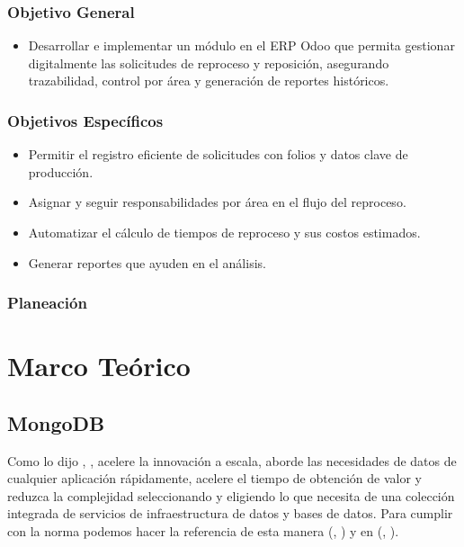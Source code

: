 \documentclass[12pt,letterpaper,spanish]{report}
\begin{document}
\subsection{Objetivo General}
\begin{itemize}
\item Desarrollar e implementar un módulo en el ERP Odoo que permita gestionar digitalmente las solicitudes de reproceso y reposición, asegurando trazabilidad, control por área y generación de reportes históricos.
\end{itemize}
\subsection{Objetivos Específicos}
\begin{itemize}
\item Permitir el registro eficiente de solicitudes con folios y datos clave de producción.
\item Asignar y seguir responsabilidades por área en el flujo del reproceso.
\item Automatizar el cálculo de tiempos de reproceso y sus costos estimados.
\item Generar reportes que ayuden en el análisis.
\end{itemize}
\subsection{Planeación}




\chapter{Marco Teórico}
\newpage

\section{MongoDB}

Como lo dijo \citeauthor{ArBre}, \citeyear{ArBre}, acelere la innovación a escala, aborde las necesidades de datos de cualquier aplicación rápidamente, acelere el tiempo de obtención de valor y reduzca la complejidad seleccionando y eligiendo lo que necesita de una colección integrada de servicios de infraestructura de datos y bases de datos. Para cumplir con la norma podemos hacer la referencia de esta manera (\citeauthor{mongodb}, \citeyear{mongodb}) y en (\citeauthor{ArBre}, \citeyear{ArBre}).
\end{document}
